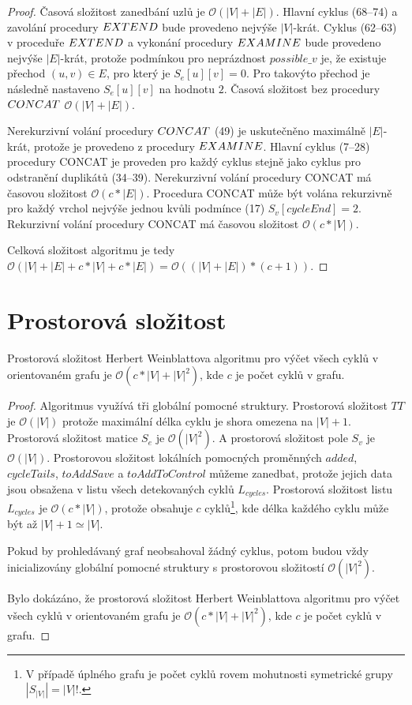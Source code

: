         \begin{proof}
            Časová složitost zanedbání uzlů je $\mathcal{O}(|V| + |E|)$. Hlavní cyklus (68--74) a zavolání procedury $\mathnormal{EXTEND}$ bude provedeno nejvýše $|V|$-krát. Cyklus (62--63) v proceduře $\mathnormal{EXTEND}$ a vykonání procedury $\mathnormal{EXAMINE}$ bude provedeno nejvýše $|E|$-krát, protože podmínkou pro neprázdnost $possible\_v$ je, že existuje přechod $(u, v) \in E$, pro který je $S_e[u][v] = 0$. Pro takovýto přechod je následně nastaveno $S_e[u][v]$ na hodnotu $2$. Časová složitost bez procedury $\mathnormal{CONCAT}$ $\mathcal{O}(|V| + |E|)$.

            Nerekurzivní volání procedury $\mathnormal{CONCAT}$ (49) je uskutečněno maximálně $|E|$-krát, protože je provedeno z procedury $\mathnormal{EXAMINE}$. Hlavní cyklus (7--28) procedury CONCAT je proveden pro každý cyklus stejně jako cyklus pro odstranění duplikátů (34--39). Nerekurzivní volání procedury CONCAT má časovou složitost $\mathcal{O}(c*|E|)$. Procedura CONCAT může být volána rekurzivně pro každý vrchol nejvýše jednou kvůli podmínce (17) $S_v[cycleEnd] = 2$. Rekurzivní volání procedury CONCAT má časovou složitost $\mathcal{O}(c * |V|)$.

            Celková složitost algoritmu je tedy $\mathcal{O}(|V| + |E| + c*|V| + c*|E|) = \mathcal{O}((|V| + |E|) * (c + 1))$.
        \end{proof}

    \section{Prostorová složitost}
        \begin{theorem}
            Prostorová složitost Herbert Weinblattova algoritmu pro výčet všech cyklů v orientovaném grafu je $\mathcal{O}(c * |V| + |V|^2)$, kde $c$ je počet cyklů v grafu.
        \end{theorem}

        \begin{proof}
            Algoritmus využívá tři globální pomocné struktury. Prostorová složitost $TT$ je $\mathcal{O}(|V|)$ protože maximální délka cyklu je shora omezena na $|V| + 1$. Prostorová složitost matice $S_e$ je $\mathcal{O}(|V|^2)$. A prostorová složitost pole $S_v$ je $\mathcal{O}(|V|)$. Prostorovou složitost lokálních pomocných proměnných $added$, $cycleTails$, $toAddSave$ a $toAddToControl$ můžeme zanedbat, protože jejich data jsou obsažena v listu všech detekovaných cyklů $L_{cycles}$. Prostorová složitost listu $L_{cycles}$ je $\mathcal{O}(c * |V|)$, protože obsahuje $c$ cyklů\footnote{V případě úplného grafu je počet cyklů rovem mohutnosti symetrické grupy $|S_{|V|}| = |V|!$.}, kde délka každého cyklu může být až $|V| + 1 \simeq |V|$.

            Pokud by prohledávaný graf neobsahoval žádný cyklus, potom budou vždy inicializovány globální pomocné struktury s prostorovou složitostí $\mathcal{O}(|V|^2)$.

            Bylo dokázáno, že prostorová složitost Herbert Weinblattova algoritmu pro výčet všech cyklů v orientovaném grafu je $\mathcal{O}(c * |V| + |V|^2)$, kde $c$ je počet cyklů v grafu.
        \end{proof}

